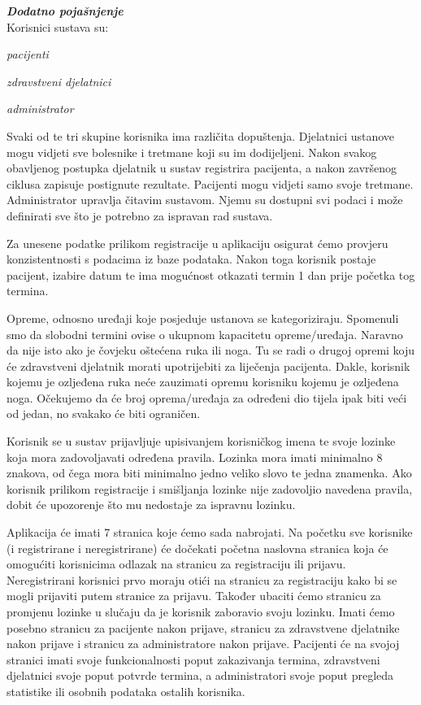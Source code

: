 \textbf{\textit{Dodatno pojašnjenje}}\\

Korisnici sustava su:

\begin{packed_item}
	\item \textit{pacijenti}
	\item \textit{zdravstveni djelatnici}
	\item \textit{administrator}
\end{packed_item}

Svaki od te tri skupine korisnika ima različita dopuštenja. Djelatnici ustanove mogu vidjeti sve bolesnike i tretmane koji su im dodijeljeni. Nakon svakog obavljenog postupka djelatnik u sustav registrira pacijenta, a nakon završenog ciklusa zapisuje postignute rezultate. Pacijenti mogu vidjeti samo svoje tretmane. Administrator upravlja čitavim sustavom. Njemu su dostupni svi podaci i može definirati sve što je potrebno za ispravan rad sustava.

Za unesene podatke prilikom registracije u aplikaciju osigurat ćemo provjeru konzistentnosti s podacima iz baze podataka. Nakon toga korisnik postaje pacijent, izabire datum te ima mogućnost otkazati termin 1 dan prije početka tog termina.

Opreme, odnosno uređaji koje posjeduje ustanova se kategoriziraju. Spomenuli smo da slobodni termini ovise o ukupnom kapacitetu opreme/uređaja. Naravno da nije isto ako je čovjeku oštećena ruka ili noga. Tu se radi o drugoj opremi koju će zdravstveni djelatnik morati upotrijebiti za liječenja pacijenta. Dakle, korisnik kojemu je ozljeđena ruka neće zauzimati opremu korisniku kojemu je ozljeđena noga. Očekujemo da će broj oprema/uređaja za određeni dio tijela ipak biti veći od jedan, no svakako će biti ograničen.

Korisnik se u sustav prijavljuje upisivanjem korisničkog imena te svoje lozinke koja mora zadovoljavati određena pravila. Lozinka mora imati minimalno 8 znakova, od čega mora biti minimalno jedno veliko slovo te jedna znamenka. Ako korisnik prilikom registracije i smišljanja lozinke nije zadovoljio navedena pravila, dobit će upozorenje što mu nedostaje za ispravnu lozinku.

Aplikacija će imati 7 stranica koje ćemo sada nabrojati. Na početku sve korisnike (i registrirane i neregistrirane) će dočekati početna naslovna stranica koja će omogućiti korisnicima odlazak na stranicu za registraciju ili prijavu. Neregistrirani korisnici prvo moraju otići na stranicu za registraciju kako bi se mogli prijaviti putem stranice za prijavu. Također ubaciti ćemo stranicu za promjenu lozinke u slučaju da je korisnik zaboravio svoju lozinku. Imati ćemo posebno stranicu za pacijente nakon prijave, stranicu za zdravstvene djelatnike nakon prijave i stranicu za administratore nakon prijave. Pacijenti će na svojoj stranici imati svoje funkcionalnosti poput zakazivanja termina, zdravstveni djelatnici svoje poput potvrde termina, a administratori svoje poput pregleda statistike ili osobnih podataka ostalih korisnika. \\

